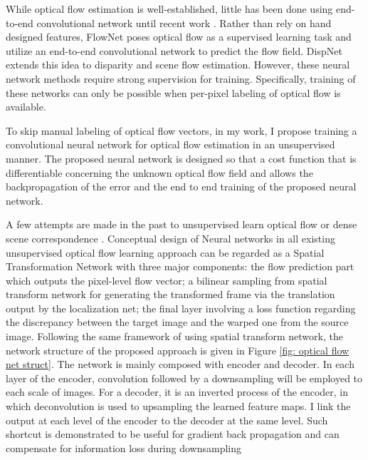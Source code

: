\documentclass{iitthesis}
\begin{document}
While optical flow estimation is well-established, little has been done using end-to-end convolutional network until recent work \cite{7410673}\cite{Ranjan_2017_CVPR}. Rather than rely on hand designed features, FlowNet\cite{7410673} poses optical flow as a supervised learning task and utilize an end-to-end convolutional network to predict the flow field. DispNet \cite{mayer2016large} extends this idea to disparity and scene flow estimation. However, these neural network methods require strong supervision for training. Specifically, training of these networks can only be possible when per-pixel labeling of optical flow is available.

To skip manual labeling of optical flow vectors, in my work, I propose training a convolutional neural network for optical flow estimation in an unsupervised manner. The proposed neural network is designed so that a cost function that is differentiable concerning the unknown optical flow field and allows the backpropagation of the error and the end to end training of the proposed neural network.

A few attempts are made in the past to unsupervised learn optical flow or dense scene correspondence \cite{ahmadi2016unsupervised}\cite{ren2017unsupervised}\cite{DBLP:journals/corr/YuHD16}. Conceptual design of Neural networks in all existing unsupervised optical flow learning approach can be regarded as a Spatial Transformation Network \cite{NIPS2015_5854} with three major components: the flow prediction part which outputs the pixel-level flow vector; a bilinear sampling from spatial transform network \cite{NIPS2015_5854} for generating the transformed frame via the translation output by the localization net; the final layer involving a loss function regarding the discrepancy between the target image and the warped one from the source image. Following the same framework of using spatial transform network, the network structure of the proposed approach is given in Figure \ref{fig: optical flow net struct}. The network is mainly composed with encoder and decoder. In each layer of the encoder, convolution followed by a downsampling will be employed to each scale of images. For a decoder, it is an inverted process of the encoder, in which deconvolution is used to upsampling the learned feature maps. I link the output at each level of the encoder to the decoder at the same level. Such shortcut is demonstrated to be useful for gradient back propagation and can compensate for information loss during downsampling \cite{ronneberger2015u} 
\end{document}
